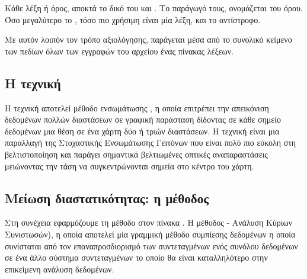 Κάθε λέξη ή όρος, αποκτά το δικό του  και  . Το παράγωγό τους, ονομάζεται  του όρου. Όσο μεγαλύτερο το , τόσο πιο χρήσιμη είναι μία λέξη, και το αντίστροφο.

Με αυτόν λοιπόν τον τρόπο αξιολόγησης, παράγεται μέσα από το συνολικό κείμενο των πεδίων  όλων των εγγραφών του αρχείου ένας πίνακας λέξεων.

\subsection{H τεχνική }
H τεχνική  αποτελεί μέθοδο ενσωμάτωσης , η οποία επιτρέπει την απεικόνιση δεδομένων πολλών διαστάσεων σε γραφική παράσταση δίδοντας σε κάθε σημείο δεδομένων μια θέση σε ένα χάρτη δύο ή τριών διαστάσεων. Η τεχνική είναι μια παραλλαγή της Στοχαστικής Ενσωμάτωσης Γειτόνων  που είναι πολύ πιο εύκολη στη βελτιστοποίηση και παράγει σημαντικά βελτιωμένες οπτικές αναπαραστάσεις μειώνοντας την τάση να συγκεντρώνονται σημεία στο κέντρο του χάρτη.

\subsection{Μείωση διαστατικότητας: η μέθοδος }
Στη συνέχεια εφαρμόζουμε τη μέθοδο  στον πίνακα . 
Η μέθοδος  - Ανάλυση Κύριων Συνιστωσών), η οποία αποτελεί μία γραμμική μέθοδο συμπίεσης δεδομένων η οποία συνίσταται από τον επαναπροσδιορισμό των συντεταγμένων ενός συνόλου δεδομένων σε ένα άλλο σύστημα συντεταγμένων το οποίο θα είναι καταλληλότερο στην επικείμενη ανάλυση δεδομένων.  

